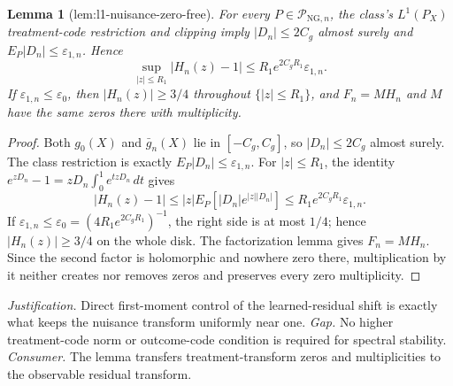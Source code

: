 \documentclass{article}
\newtheorem{lemma}{Lemma}
\begin{document}
\begin{lemma}[lem:l1-nuisance-zero-free]\label{lem:l1-nuisance-zero-free}
For every \(P\in\mathcal P_{\mathrm{NG},n}\), the class's \(L^1(P_X)\) treatment-code restriction and clipping imply \(|D_n|\le2C_g\) almost surely and \(E_P|D_n|\le\varepsilon_{1,n}\). Hence
\[
 \sup_{|z|\le R_1}|H_n(z)-1|
 \le R_1e^{2C_gR_1}\varepsilon_{1,n}.
\]
If \(\varepsilon_{1,n}\le\varepsilon_0\), then \(|H_n(z)|\ge3/4\) throughout \(\{|z|\le R_1\}\), and \(F_n=M H_n\) and \(M\) have the same zeros there with multiplicity.
\end{lemma}
\begin{proof}
Both \(g_0(X)\) and \(\bar g_n(X)\) lie in \([-C_g,C_g]\), so \(|D_n|\le2C_g\) almost surely.  The class restriction is exactly \(E_P|D_n|\le\varepsilon_{1,n}\).  For \(|z|\le R_1\), the identity
\(e^{zD_n}-1=zD_n\int_0^1e^{tzD_n}\,dt\) gives
\[
 |H_n(z)-1|
 \le |z|E_P[|D_n|e^{|z||D_n|}]
 \le R_1e^{2C_gR_1}\varepsilon_{1,n}.
\]
If \(\varepsilon_{1,n}\le\varepsilon_0=(4R_1e^{2C_gR_1})^{-1}\), the right side is at most \(1/4\); hence \(|H_n(z)|\ge3/4\) on the whole disk.  The factorization lemma gives \(F_n=MH_n\).  Since the second factor is holomorphic and nowhere zero there, multiplication by it neither creates nor removes zeros and preserves every zero multiplicity.
\end{proof}
\par\smallskip\noindent \textit{Justification.} Direct first-moment control of the learned-residual shift is exactly what keeps the nuisance transform uniformly near one. \textit{Gap.} No higher treatment-code norm or outcome-code condition is required for spectral stability. \textit{Consumer.} The lemma transfers treatment-transform zeros and multiplicities to the observable residual transform.
\end{document}
